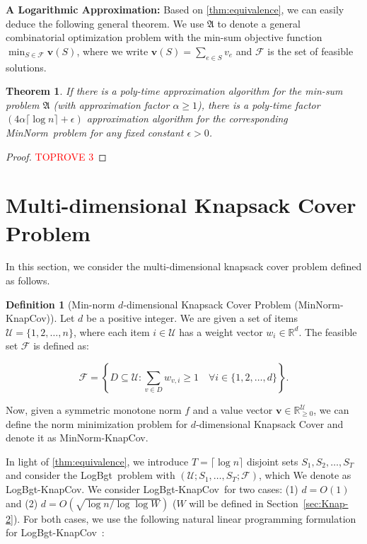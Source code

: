 \documentclass[11pt,a4paper]{article} \usepackage{enumitem}
\newcommand{\calF}{\mathcal{F}}
\newcommand{\calU}{\mathcal{U}}
\newcommand{\boldv}{\boldsymbol{v}}
\newcommand{\minnorm}{\textsf{MinNorm}}
\newcommand{\LBO}{\textsf{LogBgt}}
\newcommand{\minnormknapcov}{\textsf{MinNorm-KnapCov}}
\newcommand{\LBOknapcov}{\textsf{LogBgt-KnapCov}}
\newcommand{\myproblem}{\mathfrak{A}}
\newtheorem{theorem}{Theorem}[section]
\theoremstyle{definition}
\newtheorem{definition}{Definition}[section]
\begin{document}
\vspace{0.1cm}
\noindent
{\bf A Logarithmic Approximation:}
Based on \cref{thm:equivalence}, we can easily deduce the following general theorem.
We use $\myproblem$ to denote a general combinatorial optimization problem with the min-sum objective function
$\min_{S\in \calF} \boldv(S)$, 
where we write $\boldv(S)=\sum_{e\in S}v_e$
and 
$\calF$ is the set of feasible solutions.


\begin{theorem}
\label{thm:logapprox}
If there is a poly-time approximation algorithm for the min-sum problem $\myproblem$ (with approximation factor $\alpha\geq 1$), 
there is a poly-time factor $(4\alpha\lceil\log n\rceil+\epsilon)$ approximation algorithm for the corresponding \minnorm\ problem for any fixed constant $\epsilon>0$.
\end{theorem}

\begin{proof}\textcolor{red}{TOPROVE 3}\end{proof}
 
\section{Multi-dimensional Knapsack Cover Problem} 
\label{sec:knapsackcover}
In this section, we consider the multi-dimensional knapsack cover problem
defined as follows.

\begin{definition}[Min-norm $d$-dimensional Knapsack Cover Problem (\minnormknapcov)]
Let $d$ be a positive integer.
We are given a set of items $\calU = \{1, 2, \dots, n\}$, where each item $i \in \calU$ has a weight vector $w_i \in \mathbb{R}^d$. The feasible set $\calF$ is defined as:

\[
\calF = \left\{ D \subseteq \calU : \sum_{v \in D} w_{v,i} \geq 1 \quad \forall i \in \{1, 2, \dots, d\} \right\}.
\]

Now, given a symmetric monotone norm $f$ and a value vector $\boldv \in \mathbb{R}_{\geq 0}^{\calU}$,
we can define the norm minimization problem for $d$-dimensional Knapsack Cover and denote it as \minnormknapcov.
\end{definition}

In light of \cref{thm:equivalence}, 
we introduce $T = \lceil \log n \rceil$ disjoint sets $S_1, S_2, \dots, S_T$ and consider the \LBO\ problem with $(\calU;S_1,\ldots,S_{T};\calF)$,
which We denote as 
\LBOknapcov.
We consider \LBOknapcov\ for two cases:
(1)
$d=O(1)$ and 
(2) \(d = O( \sqrt{\log n/\log\log W})\) ($W$ will be defined 
in Section~\ref{sec:Knap-2}).
For both cases, we use the following natural linear programming formulation for \LBOknapcov\ :
\end{document}
